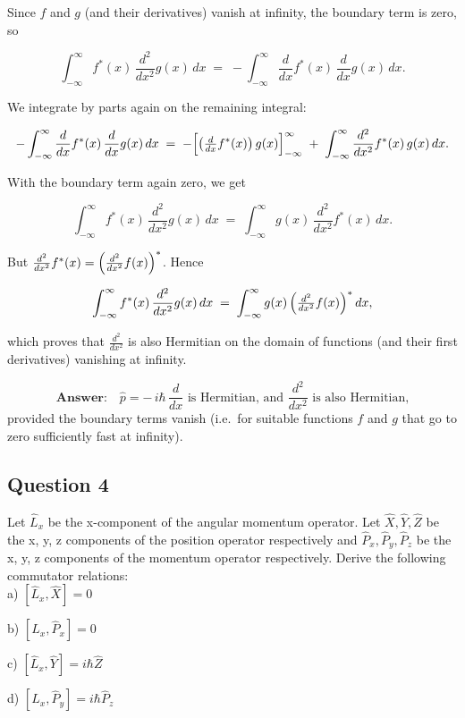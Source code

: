 \documentclass{article}
\begin{document}
Since \(f\) and \(g\) (and their derivatives) vanish at infinity, the boundary term is zero, so

\[
\int_{-\infty}^\infty f^*(x)\,\frac{d^2}{dx^2}g(x)\,dx
\;=\;
-\int_{-\infty}^\infty \frac{d}{dx}f^*(x)\,\frac{d}{dx}g(x)\,dx.
\]

We integrate by parts again on the remaining integral:

\[
-\int_{-\infty}^\infty \frac{d}{dx}f^*(x)\,\frac{d}{dx}g(x)\,dx
\;=\;
- \Bigl[\bigl(\tfrac{d}{dx}f^*(x)\bigr)\,g(x)\Bigr]_{-\infty}^\infty
\;+\;
\int_{-\infty}^\infty \frac{d^2}{dx^2}f^*(x)\,g(x)\,dx.
\]

With the boundary term again zero, we get

\[
\int_{-\infty}^\infty f^*(x)\,\frac{d^2}{dx^2}g(x)\,dx
\;=\;
\int_{-\infty}^\infty g(x)\,\frac{d^2}{dx^2}f^*(x)\,dx.
\]

But \(\frac{d^2}{dx^2}f^*(x) = \Bigl(\frac{d^2}{dx^2}f(x)\Bigr)^*\). Hence

\[
\int_{-\infty}^\infty f^*(x)\,\frac{d^2}{dx^2}g(x)\,dx
\;=\;
\int_{-\infty}^\infty g(x)\,\Bigl(\tfrac{d^2}{dx^2}f(x)\Bigr)^*\,dx,
\]

which proves that \(\frac{d^2}{dx^2}\) is also Hermitian on the domain of functions (and their first derivatives) vanishing at infinity.

\[
\textbf{Answer:}
\quad
\hat{p} = -\,i\hbar \,\frac{d}{dx} \text{ is Hermitian, and }
\frac{d^2}{dx^2}\text{ is also Hermitian,}
\]
provided the boundary terms vanish (i.e.\ for suitable functions \(f\) and \(g\) that go to zero sufficiently fast at infinity).


\subsection{Question 4}

Let $\hat{L}_x$ be the x-component of the angular momentum operator. Let $\hat{X}, \hat{Y}, \hat{Z}$ be the x, y, z components of the position operator respectively and $\hat{P}_x, \hat{P}_y, \hat{P}_z$ be the x, y, z components of the momentum operator respectively. Derive the following commutator relations:   \\

a) $\left[\hat{L}_x, \hat{X}\right] = 0$  

b) $\left[\hat{L}_x, \hat{P}_x\right] = 0$  

c) $\left[\hat{L}_x, \hat{Y}\right] = i\hbar \hat{Z}$  

d) $\left[\hat{L}_x, \hat{P}_y\right] = i\hbar \hat{P}_z$  
\end{document}
